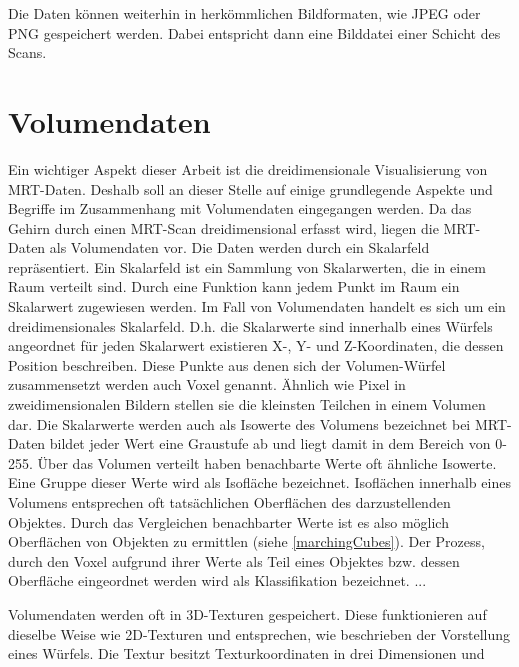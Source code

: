 Die Daten können weiterhin in herkömmlichen Bildformaten, wie JPEG oder PNG gespeichert werden. Dabei entspricht dann eine Bilddatei einer Schicht des Scans. 
 

\section{Volumendaten}							  	  %

Ein wichtiger Aspekt dieser Arbeit ist die dreidimensionale Visualisierung von MRT-Daten. Deshalb soll an dieser Stelle auf einige grundlegende Aspekte und Begriffe im Zusammenhang mit Volumendaten eingegangen werden. Da das Gehirn durch einen MRT-Scan dreidimensional erfasst wird, liegen die MRT-Daten als Volumendaten vor. Die Daten werden durch ein Skalarfeld repräsentiert. Ein Skalarfeld ist ein Sammlung von Skalarwerten, die in einem Raum verteilt sind. Durch eine Funktion kann jedem Punkt im Raum ein Skalarwert zugewiesen werden. Im Fall von Volumendaten handelt es sich um ein dreidimensionales Skalarfeld. D.h. die Skalarwerte sind innerhalb eines Würfels angeordnet für jeden Skalarwert existieren X-, Y- und Z-Koordinaten, die dessen Position beschreiben. 
Diese Punkte aus denen sich der Volumen-Würfel zusammensetzt werden auch Voxel genannt. Ähnlich wie Pixel in zweidimensionalen Bildern stellen sie die kleinsten Teilchen in einem Volumen dar. 
Die Skalarwerte werden auch als Isowerte des Volumens bezeichnet bei MRT-Daten bildet jeder Wert eine Graustufe ab und liegt damit in dem Bereich von 0-255. 
Über das Volumen verteilt haben benachbarte Werte oft ähnliche Isowerte. Eine Gruppe dieser Werte wird als Isofläche bezeichnet. Isoflächen innerhalb eines Volumens entsprechen oft tatsächlichen Oberflächen des darzustellenden Objektes. Durch das Vergleichen benachbarter Werte ist es also möglich Oberflächen von Objekten zu ermittlen (siehe \ref{marchingCubes}). 
Der Prozess, durch den Voxel aufgrund ihrer Werte als Teil eines Objektes bzw. dessen Oberfläche eingeordnet werden wird als Klassifikation bezeichnet. ...

Volumendaten werden oft in 3D-Texturen gespeichert. Diese funktionieren auf dieselbe Weise wie 2D-Texturen und entsprechen, wie beschrieben der Vorstellung eines Würfels. Die Textur besitzt Texturkoordinaten in drei Dimensionen und 

